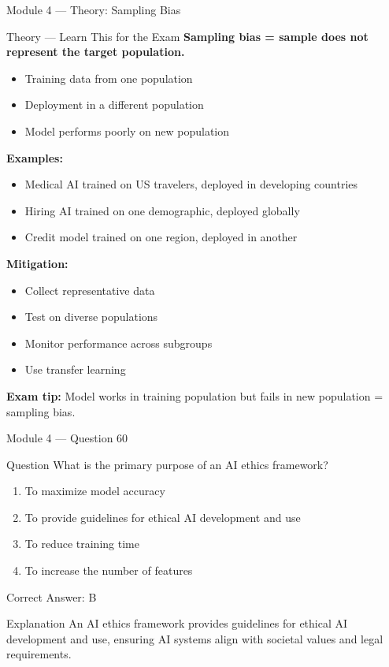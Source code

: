 \documentclass[aspectratio=169,10pt]{beamer}
\newcommand{\question}[1]{%
	\begin{block}{Question}
		#1
	\end{block}
}
\newcommand{\options}[4]{%
	\begin{enumerate}[label=\Alph*.,leftmargin=*]
		\item #1
		\item #2
		\item #3
		\item #4
	\end{enumerate}
}
\newcommand{\answerbox}[1]{%
	\begin{exampleblock}{Correct Answer: #1}
	\end{exampleblock}
}
\newcommand{\explain}[1]{%
	\begin{block}{Explanation}
		\small #1
	\end{block}
}
\newcommand{\theory}[1]{%
	\begin{block}{Theory --- Learn This for the Exam}
		\small #1
	\end{block}
}
\begin{document}
	\begin{frame}{Module 4 --- Theory: Sampling Bias}
		\theory{
			\textbf{Sampling bias = sample does not represent the target population.}
			\begin{itemize}
				\item Training data from one population
				\item Deployment in a different population
				\item Model performs poorly on new population
			\end{itemize}
			\textbf{Examples:}
			\begin{itemize}
				\item Medical AI trained on US travelers, deployed in developing countries
				\item Hiring AI trained on one demographic, deployed globally
				\item Credit model trained on one region, deployed in another
			\end{itemize}
			\textbf{Mitigation:}
			\begin{itemize}
				\item Collect representative data
				\item Test on diverse populations
				\item Monitor performance across subgroups
				\item Use transfer learning
			\end{itemize}
			\textbf{Exam tip:} Model works in training population but fails in new population = sampling bias.
		}
	\end{frame}
	
	\begin{frame}{Module 4 --- Question 60}
		\question{What is the primary purpose of an AI ethics framework?}
		\options{To maximize model accuracy}{To provide guidelines for ethical AI development and use}{To reduce training time}{To increase the number of features}
		\answerbox{B}
		\explain{An AI ethics framework provides guidelines for ethical AI development and use, ensuring AI systems align with societal values and legal requirements.}
	\end{frame}
	
\end{document}

